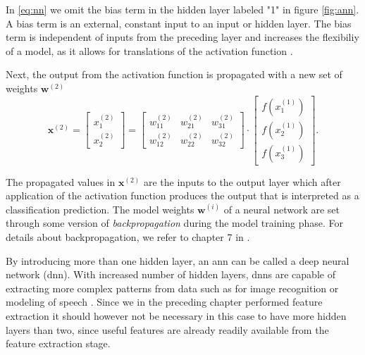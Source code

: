 In \eqref{eq:nn} we omit the bias term in the hidden layer labeled "1" in figure \ref{fig:ann}. A bias term is an external, constant input to an input or hidden layer. The bias term is independent of inputs from the preceding layer and increases the flexibiliy of a model, as it allows for translations of the activation function \citep{kohl_2010}.

Next, the output from the activation function is propagated with a new set of weights $\mathbf{w}^{(2)}$
\begin{equation}
	\mathbf{x}^{(2)}=\begin{bmatrix}x_1^{(2)} \\ x_2^{(2)} \end{bmatrix} = 
	\begin{bmatrix} w_{11}^{(2)} & w_{21}^{(2)} & w_{31}^{(2)} \\ w_{12}^{(2)} & w_{22}^{(2)} & w_{32}^{(2)} \end{bmatrix}\cdot \begin{bmatrix}f(x_1^{(1)}) \\ f(x_2^{(1)}) \\ f(x_3^{(1)}) \end{bmatrix}.
\end{equation}

The propagated values in $\mathbf{x}^{(2)}$ are the inputs to the output layer which after application of the activation function produces the output that is interpreted as a classification prediction. The model weights $\mathbf{w}^{(i)}$ of a neural network are set through some version of \textit{backpropagation} during the model training phase. For details about backpropagation, we refer to chapter 7 in \citep{rojas_1996}.

By introducing more than one hidden layer, an \gls{ann} can be called a deep neural network (\gls{dnn}). With increased number of hidden layers, \gls{dnn}s are capable of extracting more complex patterns from data such as for image recognition \citep{szegedy_liu_jia_sermanet_reed_anguelov_erhan_vanhoucke_rabinovich_2018} or modeling of speech \citep{hinton_deng_yu_dahl_mohamed_jaitly_senior_vanhoucke_nguyen_sainath_2012}. Since we in the preceding chapter performed feature extraction it should however not be necessary in this case to have more hidden layers than two, since useful features are already readily available from the feature extraction stage.


